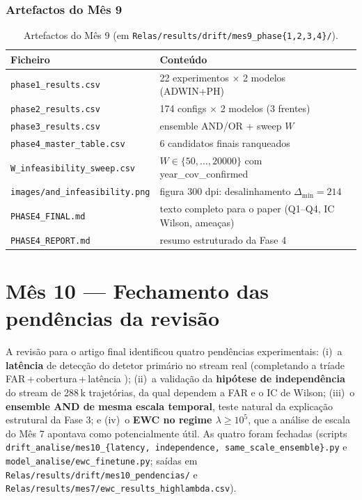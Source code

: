 \documentclass[11pt,a4paper]{article}
\begin{document}
\subsubsection{Artefactos do M\^es 9}

\begin{table}[H]
\centering\small
\begin{tabular}{l l}
\toprule
\textbf{Ficheiro} & \textbf{Conte\'udo} \\
\midrule
\texttt{phase1\_results.csv}        & 22 experimentos $\times$ 2 modelos (ADWIN+PH) \\
\texttt{phase2\_results.csv}        & 174 configs $\times$ 2 modelos (3 frentes) \\
\texttt{phase3\_results.csv}        & ensemble AND/OR + sweep $W$ \\
\texttt{phase4\_master\_table.csv}  & 6 candidatos finais ranqueados \\
\texttt{W\_infeasibility\_sweep.csv} & $W\!\in\!\{50,\ldots,20000\}$ com year\_cov\_confirmed \\
\texttt{images/and\_infeasibility.png} & figura 300 dpi: desalinhamento $\Delta_{\min}\!=\!214$ \\
\texttt{PHASE4\_FINAL.md}           & texto completo para o paper (Q1--Q4, IC Wilson, amea\c{c}as) \\
\texttt{PHASE4\_REPORT.md}          & resumo estruturado da Fase 4 \\
\bottomrule
\end{tabular}
\caption{Artefactos do M\^es 9 (em \texttt{Relas/results/drift/mes9\_phase\{1,2,3,4\}/}).}
\label{tab:m9_artefacts}
\end{table}

\section{M\^es 10 --- Fechamento das pend\^encias da revis\~ao}
\label{sec:mes10}

A revis\~ao para o artigo final identificou quatro pend\^encias
experimentais: (i)~a \textbf{lat\^encia} de detec\c{c}\~ao do detetor
prim\'ario no stream real (completando a tr\'iade
FAR\,+\,cobertura\,+\,lat\^encia \cite{gama2014,lu2019});
(ii)~a valida\c{c}\~ao da \textbf{hip\'otese de independ\^encia} do
stream de 288\,k trajet\'orias, da qual dependem a FAR e o IC de Wilson;
(iii)~o \textbf{ensemble AND de mesma escala temporal}, teste natural da
explica\c{c}\~ao estrutural da Fase 3; e (iv)~o \textbf{EWC no regime
$\lambda\!\geq\!10^5$}, que a an\'alise de escala do M\^es 7 apontava
como potencialmente \'util. As quatro foram fechadas
(scripts \texttt{drift\_analise/mes10\_\{latency, independence,
same\_scale\_ensemble\}.py} e \texttt{model\_analise/ewc\_finetune.py};
sa\'idas em \texttt{Relas/results/drift/mes10\_pendencias/} e
\texttt{Relas/results/mes7/ewc\_results\_highlambda.csv}).
\end{document}
